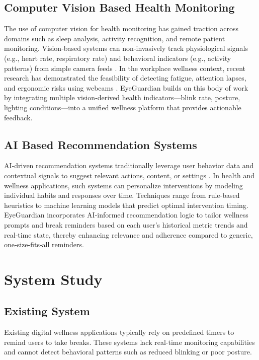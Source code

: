 \documentclass[12pt]{report}
\begin{document}
\section{Computer Vision Based Health Monitoring}
The use of computer vision for health monitoring has gained traction across domains such as sleep analysis, activity recognition, and remote patient monitoring. Vision‑based systems can non‑invasively track physiological signals (e.g., heart rate, respiratory rate) and behavioral indicators (e.g., activity patterns) from simple camera feeds \cite{soldner2019vision}. In the workplace wellness context, recent research has demonstrated the feasibility of detecting fatigue, attention lapses, and ergonomic risks using webcams \cite{jamal2021computer}. EyeGuardian builds on this body of work by integrating multiple vision‑derived health indicators—blink rate, posture, lighting conditions—into a unified wellness platform that provides actionable feedback.

\section{AI Based Recommendation Systems}
AI‑driven recommendation systems traditionally leverage user behavior data and contextual signals to suggest relevant actions, content, or settings \cite{ricci2011introduction}. In health and wellness applications, such systems can personalize interventions by modeling individual habits and responses over time. Techniques range from rule‑based heuristics to machine learning models that predict optimal intervention timing. EyeGuardian incorporates AI‑informed recommendation logic to tailor wellness prompts and break reminders based on each user’s historical metric trends and real‑time state, thereby enhancing relevance and adherence compared to generic, one‑size‑fits‑all reminders.



\chapter{System Study}

\section{Existing System}

Existing digital wellness applications typically rely on predefined timers to remind users to take breaks. These systems lack real-time monitoring capabilities and cannot detect behavioral patterns such as reduced blinking or poor posture.
\end{document}

